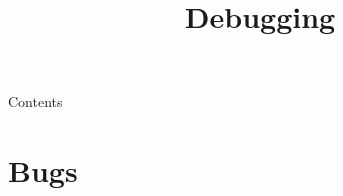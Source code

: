 

\newcommand{\topic}{
	Debugging
}

\title{\topic}
\supertitle{\course}
\date{}



\maketitle

\begin{frame}{Contents}
	\tableofcontents
\end{frame}

\section{Bugs}
